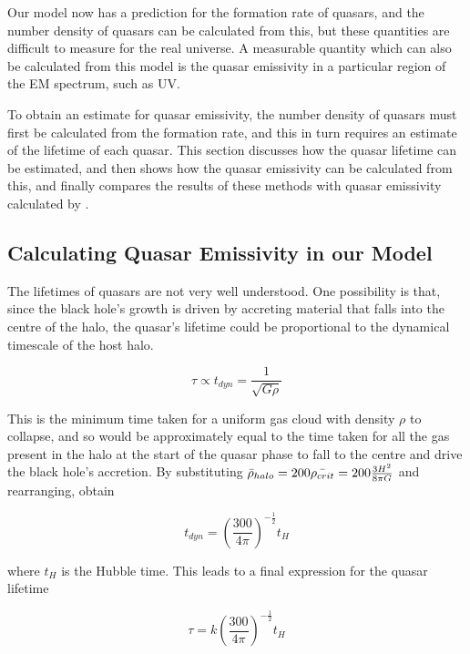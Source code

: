 \documentclass[12pt, twocolumn]{report}%
\begin{document}
Our model now has a prediction for the formation rate of quasars, and the number density of quasars can be calculated from this, but these quantities are difficult to measure for the real universe. A measurable quantity which can also be calculated from this model is the quasar emissivity in a particular region of the EM spectrum, such as UV.\par

To obtain an estimate for quasar emissivity, the number density of quasars must first be calculated from the formation rate, and this in turn requires an estimate of the lifetime of each quasar. This section discusses how the quasar lifetime can be estimated, and then shows how the quasar emissivity can be calculated from this, and finally compares the results of these methods with quasar emissivity calculated by \cite{Haardt_Madau}.

\subsection{Calculating Quasar Emissivity in our Model}

The lifetimes of quasars are not very well understood. One possibility is that, since the black hole’s growth is driven by accreting material that falls into the centre of the halo, the quasar’s lifetime could be proportional to the dynamical timescale of the host halo.

\begin{equation}
    \tau\propto t_{dyn}=\frac{1}{\sqrt{G\rho}}
\end{equation}

\noindent This is the minimum time taken for a uniform gas cloud with density $\rho$ to collapse, and so would be approximately equal to the time taken for all the gas present in the halo at the start of the quasar phase to fall to the centre and drive the black hole’s accretion. By substituting $\Bar{\rho}_{halo}=200\Bar{\rho_{crit}}=200\frac{3H^2}{8\pi G}$ and rearranging, obtain

\begin{equation}
    t_{dyn}=\left(\frac{300}{4\pi}\right)^{-\frac{1}{2}}t_H
\end{equation}

\noindent where $t_H$ is the Hubble time. This leads to a final expression for the quasar lifetime

\begin{equation}
    \tau=k\left(\frac{300}{4\pi}\right)^{-\frac{1}{2}}t_H
\end{equation}
\end{document}
